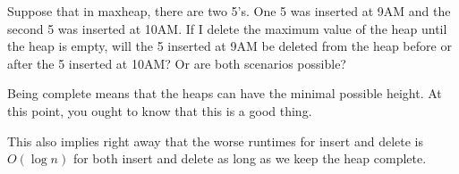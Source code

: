 \newpage
\begin{ex}
  Suppose that in maxheap, there are two 5's.
  One 5 was inserted at 9AM and the second 5 was inserted
  at 10AM.
  If I delete the maximum value of the heap
  until the heap is empty,
  will the 5 inserted at 9AM be deleted
  from the heap
  before or after the 5 inserted at 10AM?
  Or are both scenarios possible?
\end{ex}

\newpage
Being complete means that the heaps can have the minimal possible height.
At this point, you ought to know that this is a good thing.

This also implies right away that the worse runtimes for 
insert and delete is $O(\log n)$ for both insert and delete
as long as we keep the heap complete.

